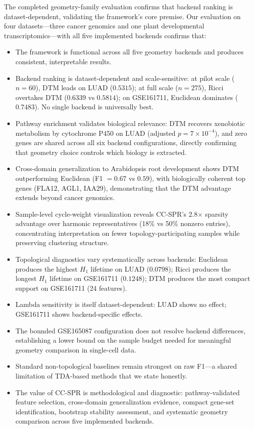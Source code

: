 \documentclass[11pt]{article}
\begin{document}
The completed geometry-family evaluation confirms that backend ranking is dataset-dependent, validating the framework's core premise.
Our evaluation on four datasets---three cancer genomics and one plant developmental transcriptomics---with all five implemented backends confirms that:
\begin{itemize}[leftmargin=1.5em]
\item The framework is functional across all five geometry backends and produces consistent, interpretable results.
\item Backend ranking is dataset-dependent and scale-sensitive: at pilot scale ($n = 60$), DTM leads on LUAD ($0.5315$); at full scale ($n = 275$), Ricci overtakes DTM ($0.6339$ vs $0.5814$); on GSE161711, Euclidean dominates ($0.7483$).
No single backend is universally best.
\item Pathway enrichment validates biological relevance: DTM recovers xenobiotic metabolism by cytochrome P450 on LUAD (adjusted $p = 7 \times 10^{-4}$), and zero genes are shared across all six backend configurations, directly confirming that geometry choice controls which biology is extracted.
\item Cross-domain generalization to Arabidopsis root development shows DTM outperforming Euclidean (F1 $= 0.67$ vs $0.59$), with biologically coherent top genes (FLA12, AGL1, IAA29), demonstrating that the DTM advantage extends beyond cancer genomics.
\item Sample-level cycle-weight visualization reveals CC-SPR's 2.8$\times$ sparsity advantage over harmonic representatives (18\% vs 50\% nonzero entries), concentrating interpretation on fewer topology-participating samples while preserving clustering structure.
\item Topological diagnostics vary systematically across backends: Euclidean produces the highest $H_1$ lifetime on LUAD ($0.0798$); Ricci produces the longest $H_1$ lifetime on GSE161711 ($0.1248$); DTM produces the most compact support on GSE161711 (24 features).
\item Lambda sensitivity is itself dataset-dependent: LUAD shows no effect; GSE161711 shows backend-specific effects.
\item The bounded GSE165087 configuration does not resolve backend differences, establishing a lower bound on the sample budget needed for meaningful geometry comparison in single-cell data.
\item Standard non-topological baselines remain strongest on raw F1---a shared limitation of TDA-based methods that we state honestly.
\item The value of CC-SPR is methodological and diagnostic: pathway-validated feature selection, cross-domain generalization evidence, compact gene-set identification, bootstrap stability assessment, and systematic geometry comparison across five implemented backends.
\end{itemize}
\end{document}
